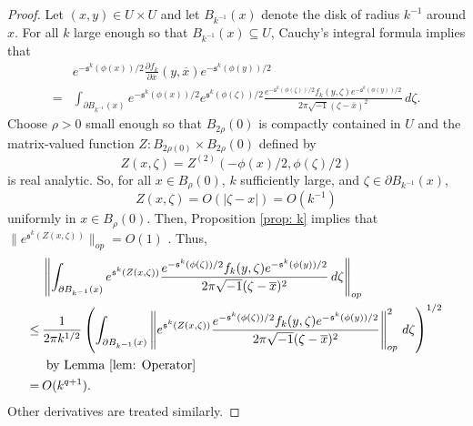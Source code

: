 \documentclass{amsart}
\theoremstyle{definition}
\theoremstyle{remark}
\numberwithin{equation}{section}
\newcommand{\deriv}[2]{\frac{\partial #1}{\partial #2}}
\begin{document}
\begin{proof}
Let $(x,y) \in U \times U$ and let $B_{k^{-1}}(x)$ denote the disk of radius $k^{-1}$ around $x$. For all $k$ large enough so that $B_{k^{-1}}(x) \subseteq U$, Cauchy's integral formula implies that
\begin{equation*}
\begin{split}
& e^{-\mathfrak{s}^k(\phi(x))/2} \deriv{f_k}{\overline{x}} (y,\overline{x}) e^{-\mathfrak{s}^k(\phi(y))/2} \\
    = & \int_{\partial B_{k^{-1}}(x)} e^{-\mathfrak{s}^k(\phi(x))/2}e^{\mathfrak{s}^k(\phi(\zeta))/2} \frac{e^{-\mathfrak{s}^k(\phi(\zeta))/2} f_k (y,\zeta) e^{-\mathfrak{s}^k(\phi(y))/2}}{2\pi \sqrt{-1} (\zeta-\overline{x})^2} \,d\zeta.
\end{split}
\end{equation*}
Choose $\rho > 0$ small enough so that $B_{2\rho}(0)$ is compactly contained in $U$ and the matrix-valued function $Z : B_{2\rho(0)} \times B_{2\rho}(0)$ defined by
\begin{equation*}
Z(x,\zeta) = Z^{(2)} \left (-\phi(x)/2, \phi(\zeta)/2\right )    
\end{equation*}
is real analytic.  So, for all $x \in B_{\rho}(0)$, $k$ sufficiently large, and $\zeta \in \partial B_{k^{-1}}(x)$, 
\begin{equation*}
Z(x,\zeta) = O(|\zeta-x|) = O(k^{-1})    
\end{equation*}
uniformly in $x \in B_\rho(0)$. Then, Proposition \ref{prop: k} implies that $\| e^{\mathfrak{s}^k(Z(x,\zeta))}\|_{op} = O(1)$ . Thus,   
\begin{align*}
& \left \| \int_{\partial B_{k^{-1}}(x)} e^{\mathfrak{s}^k(Z(x,\zeta))} \frac{e^{-\mathfrak{s}^k(\phi(\zeta))/2} f_k (y,\zeta) e^{-\mathfrak{s}^k(\phi(y))/2}}{2\pi \sqrt{-1} (\zeta-\overline{x})^2} \,d\zeta \right \|_{op} \\
    \leq \hspace{2pt} & \frac{1}{2\pi k^{1/2}} \left ( \int_{\partial B_{k^{-1}}(x)} \left \| e^{\mathfrak{s}^k(Z(x,\zeta))} \frac{e^{-\mathfrak{s}^k(\phi(\zeta))/2} f_k (y,\zeta) e^{-\mathfrak{s}^k(\phi(y))/2}}{2\pi \sqrt{-1} (\zeta-\overline{x})^2} \right \|_{op}^2 \,d\zeta \right )^{1/2} \\
    & \text{ by Lemma \ref{lem: Operator}} \\
    = \hspace{2pt} &  O(k^{q+1}).
\end{align*}
Other derivatives are treated similarly.


\end{proof}
\end{document}
